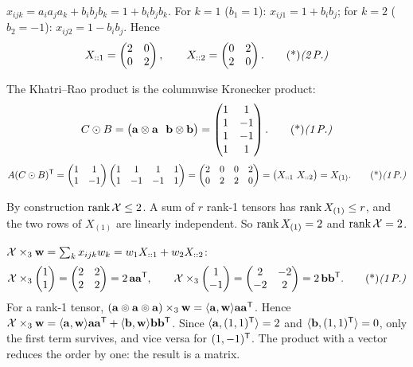 \begin{solution}
 $x_{ijk}=a_ia_ja_k+b_ib_jb_k=1+b_ib_jb_k$. For $k=1$ ($b_1=1$): $x_{ij1}=1+b_ib_j$; for $k=2$ ($b_2=-1$): $x_{ij2}=1-b_ib_j$. Hence
\[
X_{::1}=\begin{pmatrix}2&0\\0&2\end{pmatrix},\qquad X_{::2}=\begin{pmatrix}0&2\\2&0\end{pmatrix}.\ptd{2}
\]

 The Khatri--Rao product is the columnwise Kronecker product:
\[
C\kr B=\big(\vb a\otimes\vb a\ \ \vb b\otimes\vb b\big)=\begin{pmatrix}1&1\\1&-1\\1&-1\\1&1\end{pmatrix}.\ptd{1}
\]
\[
A(C\kr B)\T=\begin{pmatrix}1&1\\1&-1\end{pmatrix}\begin{pmatrix}1&1&1&1\\1&-1&-1&1\end{pmatrix}=\begin{pmatrix}2&0&0&2\\0&2&2&0\end{pmatrix}=\big(X_{::1}\ X_{::2}\big)=X_{(1)}.\ptd{1}
\]

 By construction $\operatorname{rank}\mathcal{X}\le2$. A sum of $r$ rank-1 tensors has $\operatorname{rank} X_{(1)}\le r$, and the two rows of $X_{(1)}$ are linearly independent. So $\operatorname{rank} X_{(1)}=2$ and $\operatorname{rank}\mathcal{X}=2$. 

 $\mathcal{X}\times_3\mathbf{w}=\sum_kx_{ijk}w_k=w_1X_{::1}+w_2X_{::2}$:
\[
\ten X\times_3\begin{pmatrix}1\\1\end{pmatrix}=\begin{pmatrix}2&2\\2&2\end{pmatrix}=2\,\vb a\vb a\T,\qquad
\ten X\times_3\begin{pmatrix}1\\-1\end{pmatrix}=\begin{pmatrix}2&-2\\-2&2\end{pmatrix}=2\,\vb b\vb b\T.\ptd{1}
\]
For a rank-1 tensor, $(\mathbf{a}\circledcirc\mathbf{a}\circledcirc\mathbf{a})\times_3\mathbf{w}=\langle \mathbf{a},\mathbf{w}\rangle\mathbf{a}\mathbf{a}^{\mathsf{T}}$. Hence $\mathcal{X}\times_3\mathbf{w}=\langle \mathbf{a},\mathbf{w}\rangle\mathbf{a}\mathbf{a}^{\mathsf{T}}+\langle \mathbf{b},\mathbf{w}\rangle\mathbf{b}\mathbf{b}^{\mathsf{T}}$. Since $\langle \mathbf{a},(1,1)^{\mathsf{T}}\rangle=2$ and $\langle \mathbf{b},(1,1)^{\mathsf{T}}\rangle=0$, only the first term survives, and vice versa for $(1,-1)^{\mathsf{T}}$. The product with a vector reduces the order by one: the result is a matrix. 


\end{solution}
